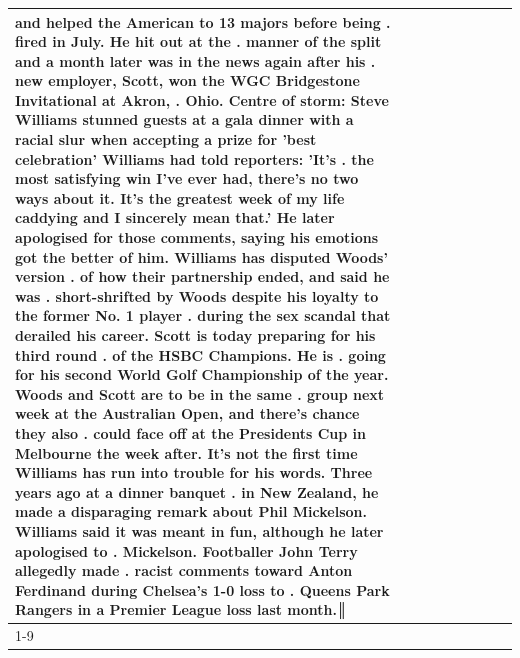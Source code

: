 \begin{table}[H]
\begin{tabular}{lllrlllll}
and helped the American to 13 majors before being . fired in July. He hit out at the . manner of the split and a month later was in the news again after his . new employer, Scott, won the WGC Bridgestone Invitational at Akron, . Ohio. Centre of storm: Steve Williams stunned guests at a gala dinner with a racial slur when accepting a prize for 'best celebration' Williams had told reporters: 'It's . the most satisfying win I've ever had, there's no two ways about it. It's the greatest week of my life caddying and I sincerely mean that.' He later apologised for those comments, saying his emotions got the better of him. Williams has disputed Woods' version . of how their partnership ended, and said he was . short-shrifted by Woods despite his loyalty to the former No. 1 player . during the sex scandal that derailed his career. Scott is today preparing for his third round . of the HSBC Champions. He is . going for his second World Golf Championship of the year. Woods and Scott are to be in the same . group next week at the Australian Open, and there's chance they also . could face off at the Presidents Cup in Melbourne the week after. It's not the first time Williams has run into trouble for his words. Three years ago at a dinner banquet . in New Zealand, he made a disparaging remark about Phil Mickelson. Williams said it was meant in fun, although he later apologised to . Mickelson. Footballer John Terry allegedly made . racist comments toward Anton Ferdinand during Chelsea's 1-0 loss to . Queens Park Rangers in a Premier League loss last month.║ \\
\cline{1-9}

\end{tabular}
\end{table}
